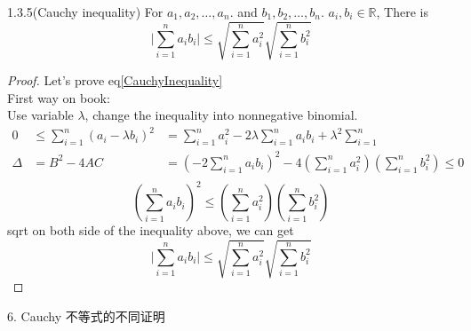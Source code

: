 \begin{proposition}
	{1.3.5(Cauchy inequality)}
	For $ a_1,a_2,\dots,a_n.$ and $b_1,b_2,\dots,b_n$. $ a_i,b_i\in\mathbb{R} $, There is
	\begin{equation}\label{CauchyInequality}
		\Big|\sum_{i=1}^n a_i b_i\Big| \leqslant \sqrt{\sum_{i=1}^n a_i^2}\sqrt{\sum_{i=1}^n b_i^2}
	\end{equation}
\end{proposition}
\begin{proof}
	Let's prove eq\ref{CauchyInequality}\\
	First way on book:\\
	Use variable $ \lambda $, change the inequality into nonnegative binomial.
	\begin{align*}
		0&\le\sum_{i=1}^n (a_i -\lambda b_i)^2 
		&=\sum_{i=1}^n a_i^2 - 2\lambda\sum_{i=1}^na_ib_i + \lambda^2\sum_{i=1}^n\\
		\Delta &= B^2-4AC &=(-2\sum_{i=1}^n a_ib_i)^2 - 4(\sum_{i=1}^na_i^2)(\sum_{i=1}^nb_i^2)\le0\\	
	\end{align*}
	\begin{equation*}
		(\sum_{i=1}^n a_ib_i)^2 \leqslant (\sum_{i=1}^na_i^2)(\sum_{i=1}^nb_i^2)
	\end{equation*}
	sqrt on both side of the inequality above, we can get
	\begin{equation*}
		\Big|\sum_{i=1}^n a_i b_i\Big| \leqslant \sqrt{\sum_{i=1}^n a_i^2}\sqrt{\sum_{i=1}^n b_i^2}
	\end{equation*}
\end{proof}
6. Cauchy 不等式的不同证明

